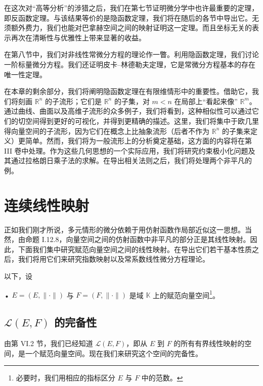 在这次对“高等分析”的涉猎之后，我们在第七节证明微分学中也许最重要的定理，即反函数定理。与该结果等价的是隐函数定理，我们将在随后的各节中导出它。无须额外费力，我们也能对巴拿赫空间之间的映射证明这一定理。而且坐标无关的表示再次在清晰性与优雅性上带来显著的收益。

在第八节中，我们对非线性常微分方程的理论作一瞥。利用隐函数定理，我们讨论一阶标量微分方程。我们还证明皮卡–林德勒夫定理，它是常微分方程基本的存在唯一性定理。

在本章的剩余部分，我们将阐明隐函数定理在有限维情形中的重要性。借助它，我们将刻画 $ \mathbb{R}^n $ 的子流形；它们是 $ \mathbb{R}^n $ 的子集，对 $ m < n $ 在局部上“看起来像” $ \mathbb{R}^m $。通过曲线、曲面以及高维子流形的众多例子，我们将看到，这种相似性可以通过它们的切空间得到更好的可视化，并得到更精确的描述。这里，我们将集中于欧几里得向量空间的子流形，因为它们在概念上比抽象流形（后者不作为 $ \mathbb{R}^n $ 的子集来定义）更简单。然而，我们将为一般流形上的分析奠定基础，这方面的内容将在第 III 卷中处理。作为这些几何思想的一个实际应用，我们将研究约束极小化问题及其通过拉格朗日乘子法的求解。在导出相关法则之后，我们将处理两个非平凡的例。

\section{连续线性映射}

正如我们刚才所说，多元情形的微分依赖于用仿射函数作局部近似这一思想。当然，由命题 I.12.8，向量空间之间的仿射函数中非平凡的部分正是其线性映射。因此，下面我们集中研究赋范向量空间之间的线性映射。在导出它们若干基本性质之后，我们将用它们来研究指数映射以及常系数线性微分方程理论。

以下，设

• $ E = (E, \|\cdot\|) $ 与 $ F = (F, \|\cdot\|) $ 是域 $ \mathbb{K} $ 上的赋范向量空间\footnote{必要时，我们用相应的指标区分 $ E $ 与 $ F $ 中的范数。}。

\subsection*{$ \mathcal{L}(E, F) $ 的完备性}

由第 VI.2 节，我们已经知道 $ \mathcal{L}(E, F) $，即从 $ E $ 到 $ F $ 的所有有界线性映射的空间，是一个赋范向量空间。现在我们来研究这个空间的完备性。

